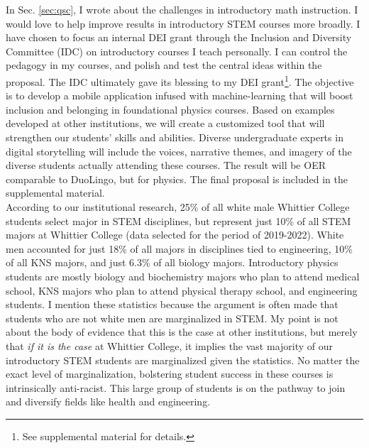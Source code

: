 \documentclass[../../../main.tex]{subfiles}
\begin{document}
\label{sec:dei}

In Sec. \ref{sec:qsc}, I wrote about the challenges in introductory math instruction.  I would love to help improve results in introductory STEM courses more broadly.  I have chosen to focus an internal DEI grant through the Inclusion and Diversity Committee (IDC) on introductory courses I teach personally.  I can control the pedagogy in my courses, and polish and test the central ideas within the proposal.  The IDC ultimately gave its blessing to my DEI grant\footnote{See supplemental material for details.}.  The objective is to develop a mobile application infused with machine-learning that will boost inclusion and belonging in foundational physics courses.  Based on examples developed at other institutions, we will create a customized tool that will strengthen our students’ skills and abilities. Diverse undergraduate experts in digital storytelling will include the voices, narrative themes, and imagery of the diverse students actually attending these courses. The result will be OER comparable to DuoLingo, but for physics.  The final proposal is included in the supplemental material.
\\
\vspace{0.15cm}
According to our institutional research, 25\% of all white male Whittier College students select major in STEM disciplines, but represent just 10\% of all STEM majors at Whittier College (data selected for the period of 2019-2022). White men accounted for just 18\% of all majors in disciplines tied to engineering, 10\% of all KNS majors, and just 6.3\% of all biology majors. Introductory physics students are mostly biology and biochemistry majors who plan to attend medical school, KNS majors who plan to attend physical therapy school, and engineering students.  I mention these statistics because the argument is often made that students who are not white men are marginalized in STEM.  My point is not about the body of evidence that this is the case at other institutions, but merely that \textit{if it is the case} at Whittier College, it implies the vast majority of our introductory STEM students are marginalized given the statistics.  No matter the exact level of marginalization, bolstering student success in these courses is intrinsically anti-racist.  This large group of students is on the pathway to join and diversify fields like health and engineering.
\\
\vspace{0.15cm}
\end{document}
